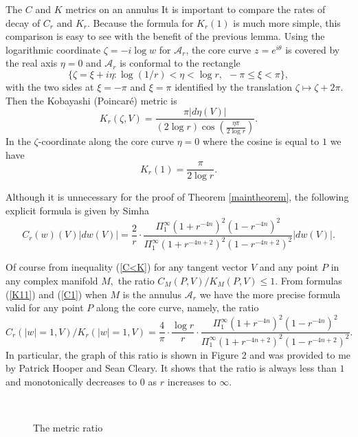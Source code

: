 \documentclass[12pt]{amsart}
\theoremstyle{remark}
\theoremstyle{definition}
\theoremstyle{definition}
\begin{document}
\begin{section}{The $C$ and $K$ metrics on an annulus}
It is important to compare the rates of decay of $C_r$ and $K_r.$ 
Because the formula for $K_r(1)$ is much more simple, this comparison is easy to see with the benefit of the previous lemma. Using the logarithmic coordinate $\zeta = - i \log w$ for ${\mathcal A}_r$, the core curve $z=e^{i\theta}$ is covered by the real axis $\eta=0$ and  ${\mathcal A}_r$ is conformal to the rectangle 
$$ \{ \zeta = \xi + i \eta: \log(1/r) < \eta < \log r, \ \ -\pi \leq \xi < \pi \},$$
with the two sides at $\xi = -\pi$ and $\xi = \pi$ identified by the translation 
$\zeta \mapsto \zeta +2 \pi.$ Then the Kobayashi (Poincar\'e) metric is 
\begin{equation}\label{K1}K_r(\zeta,V) =\frac{\pi|d\eta(V)|}{(2\log r)\cos (\frac{\eta \pi}{2\log r}) }.
\end{equation} 
In the $\zeta$-coordinate along the core curve $\eta=0$ where the cosine is equal to $1$ we have
\begin{equation}\label{K11}
K_r(1)=\frac{\pi}{2 \log r}.
\end{equation}


Although it is unnecessary for the proof of  Theorem \ref{maintheorem}, the following explicit formula is given by Simha \cite{Simha} 
\begin{equation}\label{C1}
C_r(w)(V)|dw(V)| = \frac{2}{r} \cdot
\frac{\Pi_1^{\infty}(1+r^{-4n})^2(1-r^{-4n})^2}{\Pi_1^{\infty}(1+r^{-4n+2})^2(1-r^{-4n+2})^2}|dw(V)|.
\end{equation}



Of course from inequality (\ref{C<K}) 
 for any tangent vector $V$ and any point $P$ in any complex manifold $M,$
 the ratio $C_M(P,V)/K_M(P,V) \leq 1.$
From  formulas (\ref{K11}) and (\ref{C1}) when $M$ is the annulus ${\mathcal A}_r$ we have the more precise formula valid for any point $P$ along the core curve, namely, 
the ratio \begin{equation}\label{pureratio}
C_r(|w|=1,V)/K_r(|w|=1,V) = \frac{4}{\pi} \cdot \frac{\log r}{ r} \cdot 
\frac{\Pi_1^{\infty}(1+r^{-4n})^2(1-r^{-4n})^2}
{\Pi_1^{\infty}(1+r^{-4n+2})^2(1-r^{-4n+2})^2}.
\end{equation}
    In particular, the graph of this ratio is shown in Figure 2 and was provided to me by Patrick Hooper and Sean Cleary.  It shows that the ratio is always less than $1$ and  monotonically decreases to $0$ as  $r$ increases to  $\infty.$   
\begin{figure}[htp]~\label{figure3}    
\caption{The metric ratio}\end{figure} 



 \end{section}
\end{document}
